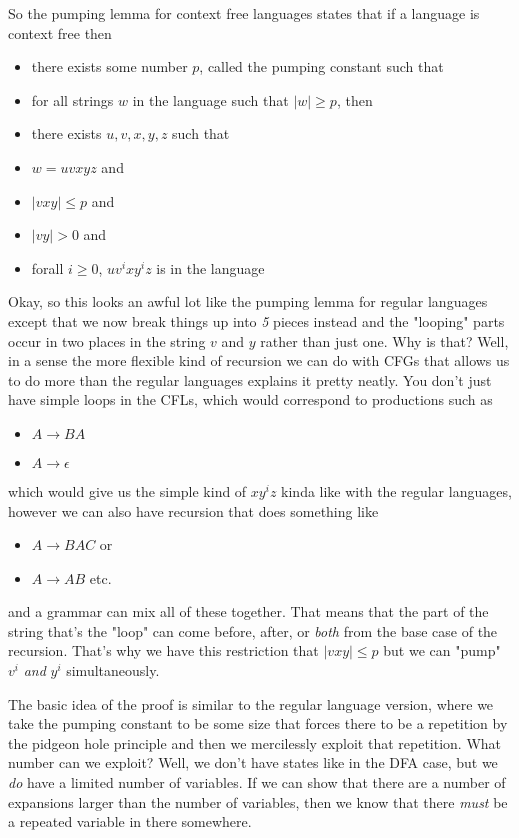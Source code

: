 \documentclass[11pt]{article}
\begin{document}
So the pumping lemma for context free languages states that if a language is context free then
\begin{itemize}
\item there exists some number $p$, called the pumping constant such that
\item for all strings $w$ in the language such that $|w| \ge p$, then
\item there exists $u,v,x,y,z$ such that
\item $w = uvxyz$ and
\item $|vxy| \le p$ and
\item $|vy| > 0$ and
\item forall $i \ge 0$, $uv^ixy^iz$ is in the language
\end{itemize}

Okay, so this looks an awful lot like the pumping lemma for regular languages except that we now break things up into \emph{5} pieces instead and the "looping" parts occur in two places in the string $v$ and $y$ rather than just one. Why is that? Well, in a sense the more flexible kind of recursion we can do with CFGs that allows us to do more than the regular languages explains it pretty neatly. You don't just have simple loops in the CFLs, which would correspond to productions such as 

\begin{itemize}
\item $A \to BA$
\item $A \to \epsilon$
\end{itemize}
which would give us the simple kind of $xy^iz$ kinda like with the regular languages, however we can also have recursion that does something like

\begin{itemize}
\item $A \to BAC$ or
\item $A \to AB$ etc.
\end{itemize}

and a grammar can mix all of these together. That means that the part of the string that's the "loop" can come before, after, or \emph{both} from the base case of the recursion. That's why we have this restriction that $|vxy| \le p$ but we can "pump" $v^i$ \emph{and} $y^i$ simultaneously. 

The basic idea of the proof is similar to the regular language version, where we take the pumping constant to be some size that forces there to be a repetition by the pidgeon hole principle and then we mercilessly exploit that repetition. What number can we exploit? Well, we don't have states like in the DFA case, but we \emph{do} have a limited number of variables. If we can show that there are a number of expansions larger than the number of variables, then we know that there \emph{must} be a repeated variable in there somewhere. 
\end{document}
